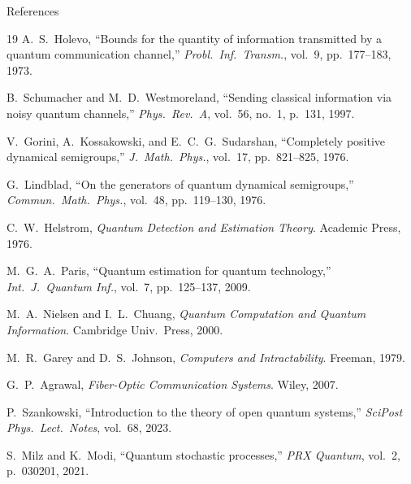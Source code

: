 \documentclass[aspectratio=169,10pt]{beamer}
\begin{document}
\appendix

\begin{frame}[allowframebreaks]{References}
  \tiny
  \begin{thebibliography}{19}
    A.~S.~Holevo, ``Bounds for the quantity of information transmitted
    by a quantum communication channel,'' \textit{Probl.\ Inf.\
    Transm.}, vol.~9, pp.~177--183, 1973.

    B.~Schumacher and M.~D.~Westmoreland, ``Sending classical
    information via noisy quantum channels,'' \textit{Phys.\ Rev.\ A},
    vol.~56, no.~1, p.~131, 1997.

    V.~Gorini, A.~Kossakowski, and E.~C.~G.~Sudarshan, ``Completely
    positive dynamical semigroups,'' \textit{J.\ Math.\ Phys.},
    vol.~17, pp.~821--825, 1976.

    G.~Lindblad, ``On the generators of quantum dynamical semigroups,''
    \textit{Commun.\ Math.\ Phys.}, vol.~48, pp.~119--130, 1976.

    C.~W.~Helstrom, \textit{Quantum Detection and Estimation Theory}.
    Academic Press, 1976.

    M.~G.~A.~Paris, ``Quantum estimation for quantum technology,''
    \textit{Int.\ J.\ Quantum Inf.}, vol.~7, pp.~125--137, 2009.

    M.~A.~Nielsen and I.~L.~Chuang, \textit{Quantum Computation and
    Quantum Information}. Cambridge Univ.\ Press, 2000.

    M.~R.~Garey and D.~S.~Johnson, \textit{Computers and
    Intractability}. Freeman, 1979.

    G.~P.~Agrawal, \textit{Fiber-Optic Communication Systems}.
    Wiley, 2007.

    P.~Szankowski, ``Introduction to the theory of open quantum
    systems,'' \textit{SciPost Phys.\ Lect.\ Notes}, vol.~68, 2023.

    S.~Milz and K.~Modi, ``Quantum stochastic processes,''
    \textit{PRX Quantum}, vol.~2, p.~030201, 2021.
  \end{thebibliography}
\end{frame}
\end{document}
